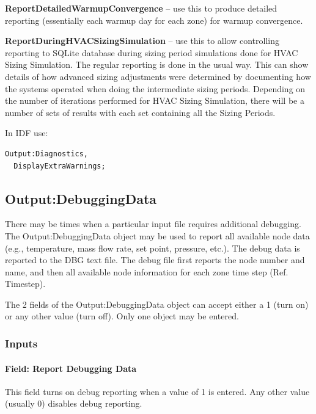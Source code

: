 \textbf{ReportDetailedWarmupConvergence} -- use this to produce detailed reporting (essentially each warmup day for each zone) for warmup convergence.

\textbf{ReportDuringHVACSizingSimulation} -- use this to allow controlling reporting to SQLite database during sizing period simulations done for HVAC Sizing Simulation. The regular reporting is done in the usual way. This can show details of how advanced sizing adjustments were determined by documenting how the systems operated when doing the intermediate sizing periods. Depending on the number of iterations performed for HVAC Sizing Simulation, there will be a number of sets of results with each set containing all the Sizing Periods.

In IDF use:

\begin{lstlisting}
Output:Diagnostics,
  DisplayExtraWarnings;
\end{lstlisting}

\subsection{Output:DebuggingData}\label{outputdebuggingdata}

There may be times when a particular input file requires additional debugging. The Output:DebuggingData object may be used to report all available node data (e.g., temperature, mass flow rate, set point, pressure, etc.). The debug data is reported to the DBG text file. The debug file first reports the node number and name, and then all available node information for each zone time step (Ref. Timestep).

The 2 fields of the Output:DebuggingData object can accept either a 1 (turn on) or any other value (turn off). Only one object may be entered.

\subsubsection{Inputs}\label{inputs-12-017}

\paragraph{Field: Report Debugging Data}\label{field-report-debugging-data}

This field turns on debug reporting when a value of 1 is entered. Any other value (usually 0) disables debug reporting.


